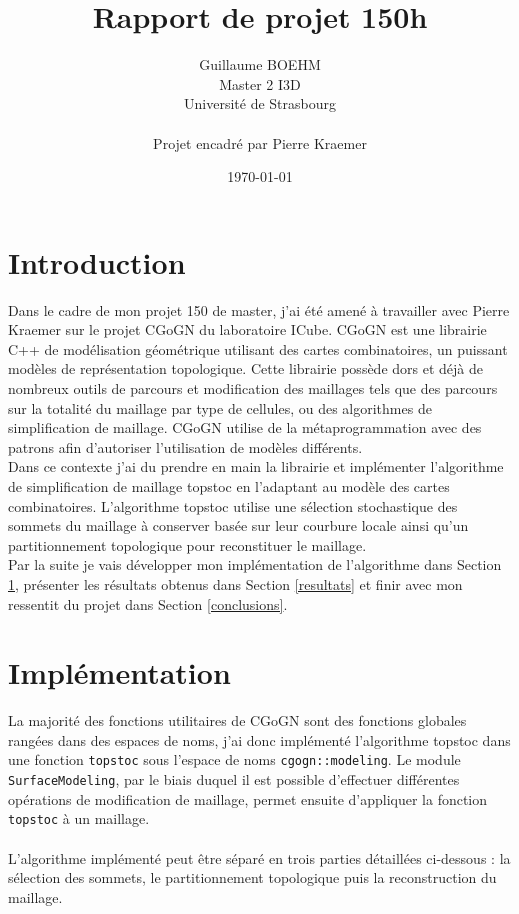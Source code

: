 \documentclass[12pt,a4paper]{article}
\title{\huge{\textbf{Rapport de projet 150h}}}
\author{
    Guillaume BOEHM \\
    Master 2 I3D\\
    Université de Strasbourg\\\\
	Projet encadré par Pierre Kraemer}
\date{\today}
\begin{document}
\maketitle
\thispagestyle{empty}

\clearpage

\thispagestyle{empty}
\setcounter{page}{0}
\tableofcontents
\clearpage

\section*{Introduction}\label{intro} %

Dans le cadre de mon projet 150 de master, j'ai été amené à travailler avec Pierre Kraemer sur le projet CGoGN du laboratoire ICube. CGoGN est une librairie C++ de modélisation géométrique utilisant des cartes combinatoires, un puissant modèles de représentation topologique. Cette librairie possède dors et déjà de nombreux outils de parcours et modification des maillages tels que des parcours sur la totalité du maillage par type de cellules, ou des algorithmes de simplification de maillage. CGoGN utilise de la métaprogrammation avec des patrons afin d'autoriser l'utilisation de modèles différents.\\
Dans ce contexte j'ai du prendre en main la librairie et implémenter l'algorithme de simplification de maillage topstoc\cite{BA:2009:MSS} en l'adaptant au modèle des cartes combinatoires. L'algorithme topstoc utilise une sélection stochastique des sommets du maillage à conserver basée sur leur courbure locale ainsi qu'un partitionnement topologique pour reconstituer le maillage.\\ Par la suite je vais développer mon implémentation de l'algorithme dans Section \ref{implementation}, présenter les résultats obtenus dans Section \ref{resultats} et finir avec mon ressentit du projet dans Section \ref{conclusions}.

\clearpage

\section{Implémentation}\label{implementation}

La majorité des fonctions utilitaires de CGoGN sont des fonctions globales rangées dans des espaces de noms, j'ai donc implémenté l'algorithme topstoc dans une fonction \verb|topstoc| sous l'espace de noms \verb|cgogn::modeling|. Le module \verb|SurfaceModeling|, par le biais duquel il est possible d'effectuer différentes opérations de modification de maillage, permet ensuite d'appliquer la fonction \verb|topstoc| à un maillage.\\\\
L'algorithme implémenté peut être séparé en trois parties détaillées ci-dessous : la sélection des sommets, le partitionnement topologique puis la reconstruction du maillage.
\end{document}
